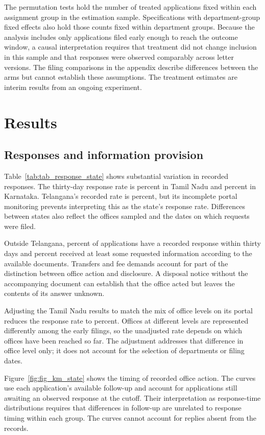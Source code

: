 \documentclass[11pt]{article}
\begin{document}
The permutation tests hold the number of treated applications fixed within each assignment group in the estimation sample. Specifications with department-group fixed effects also hold those counts fixed within department groups. Because the analysis includes only applications filed early enough to reach the outcome window, a causal interpretation requires that treatment did not change inclusion in this sample and that responses were observed comparably across letter versions. The filing comparisons in the appendix describe differences between the arms but cannot establish these assumptions. The treatment estimates are interim results from an ongoing experiment.

\section{Results}
\subsection{Responses and information provision}
Table~\ref{tab:tab_response_state} shows substantial variation in recorded responses. The thirty-day response rate is \rtianytn{} percent in Tamil Nadu and \rtianyka{} percent in Karnataka. Telangana's recorded rate is \rtianytg{} percent, but its incomplete portal monitoring prevents interpreting this as the state's response rate. Differences between states also reflect the offices sampled and the dates on which requests were filed.

Outside Telangana, \rtianyextg{} percent of applications have a recorded response within thirty days and \rtiinfoextg{} percent received at least some requested information according to the available documents. Transfers and fee demands account for part of the distinction between office action and disclosure. A disposal notice without the accompanying document can establish that the office acted but leaves the contents of its answer unknown.

\FloatBarrier

Adjusting the Tamil Nadu results to match the mix of office levels on its portal reduces the response rate to \rtianytnw{} percent. Offices at different levels are represented differently among the early filings, so the unadjusted rate depends on which offices have been reached so far. The adjustment addresses that difference in office level only; it does not account for the selection of departments or filing dates.

Figure~\ref{fig:fig_km_state} shows the timing of recorded office action. The curves use each application's available follow-up and account for applications still awaiting an observed response at the cutoff. Their interpretation as response-time distributions requires that differences in follow-up are unrelated to response timing within each group. The curves cannot account for replies absent from the records.

\FloatBarrier
\end{document}
